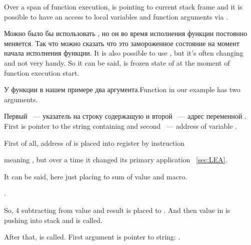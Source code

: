 {Over a span of function execution, \EBP is pointing to current stack frame and it is possible 
to have an access to local variables and function arguments via .}

\IFRU
{Можно было бы использовать \ESP, но он во время исполнения функции постоянно меняется. 
Так что можно сказать что \EBP это замороженное состояние \ESP на момент начала исполнения функции.}
{It is also possible to use \ESP, but it's often changing and not very handy.
So it can be said, \EBP is frozen state of \ESP at the moment of function execution start.}

\IFRU
{У функции \scanf в нашем примере два аргумента.}{Function \scanf in our example has two arguments.}

\IFRU
{Первый ~--- указатель на строку содержащую  и второй ~--- адрес переменной .} 
{First is pointer to the string containing  and second ~--- address of variable .} 

{First of all, address of  is placed into \EAX register by  instruction}

{\LEA meaning , but over a time it changed its primary application}
~\ref{sec:LEA}.

{It can be said, \LEA here just placing to \EAX sum of \EBP value and  macro.}

 .

{So, 4 subtracting from \EBP value and result is placed to \EAX. 
And then value in \EAX is pushing into stack and \scanf is called.}

{After that, \printf is called. First argument is pointer to string:} .

